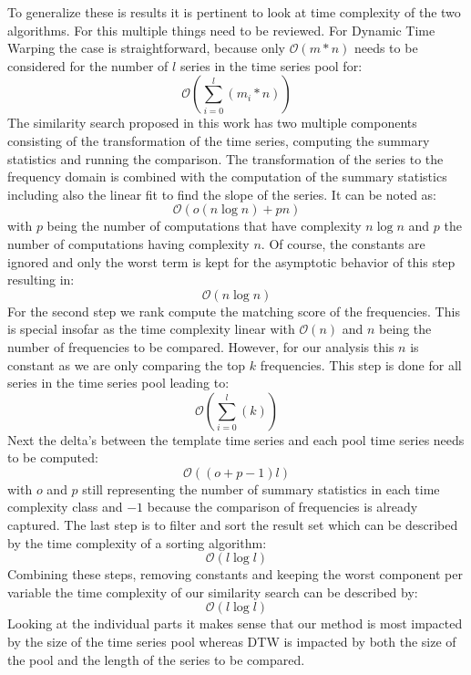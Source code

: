 \documentclass[phd,black, hidelinks]{PrincetonThesis}
\begin{document}
To generalize these is results it is pertinent to look at time complexity of the two algorithms. For this multiple things need to be reviewed. For Dynamic Time Warping the case is straightforward, because only \(\mathcal{O}(m*n)\) needs to be considered for the number of \(l\) series in the time series pool for:
\begin{equation}
\mathcal{O}(\sum_{i=0}^l (m_i*n))
\end{equation}
The similarity search proposed in this work has two multiple components consisting of the transformation of the time series, computing the summary statistics and running the comparison. The transformation of the series to the frequency domain is combined with the computation of the summary statistics including also the linear fit to find the slope of the series. It can be noted as:
\begin{equation}
\mathcal{O}(o (n \log n) + p n)
\end{equation}
with \(p\) being the number of computations that have complexity \(n \log n\) and \(p\) the number of computations having complexity \(n\). Of course, the constants are ignored and only the worst term is kept for the asymptotic behavior of this step resulting in:
\begin{equation}
\mathcal{O}(n \log n)
\end{equation}
For the second step we rank compute the matching score of the frequencies. This is special insofar as the time complexity linear with \(\mathcal{O}(n)\) and \(n\) being the number of frequencies to be compared. However, for our analysis this \(n\) is constant as we are only comparing the top \(k\) frequencies. This step is done for all series in the time series pool leading to:
\begin{equation}
\mathcal{O}(\sum_{i=0}^l (k))
\end{equation}
Next the delta's between the template time series and each pool time series needs to be computed:
\begin{equation}
\mathcal{O}((o+p-1)l)
\end{equation}
with \(o\) and \(p\) still representing the number of summary statistics in each time complexity class and \(-1\) because the comparison of frequencies is already captured. The last step is to filter and sort the result set which can be described by the time complexity of a sorting algorithm:
\begin{equation}
\mathcal{O}(l \log l)
\end{equation}
Combining these steps, removing constants and keeping the worst component per variable the time complexity of our similarity search can be described by:
\begin{equation}
\mathcal{O}(l \log l)
\end{equation}
Looking at the individual parts it makes sense that our method is most impacted by the size of the time series pool whereas DTW is impacted by both the size of the pool and the length of the series to be compared.
\end{document}
